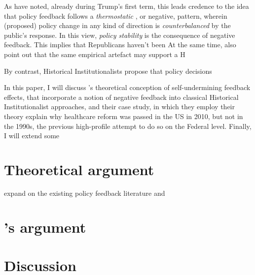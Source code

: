 \documentclass[11pt, xcolor=dvipsnames]{article}
\begin{document}
\noindent As \textcite[][]{Busemeyer2019} have noted, already during Trump's first term, this leads credence to the idea that policy feedback follows a \textit{thermostatic} \parencite[][]{Wlezien1995}, or negative, pattern, wherein (proposed) policy change in any kind of direction is \textit{counterbalanced} by the public's response. In this view, \textit{policy stability} is the consequence of negative feedback. This implies that Republicans haven't been  At the same time, \textcite[][]{Busemeyer2019} also point out that the same empirical artefact may support a H

By contrast, Historical Institutionalists propose that policy decisions 

In this paper, I will discuss \citeauthor[][]{Jacobs2014}'s \citeyear{Jacobs2014} theoretical conception of self-undermining feedback effects, that incorporate a notion of negative feedback into classical Historical Institutionalist approaches, and their case study, in which they employ their theory explain why healthcare reform was passed in the US in 2010, but not in the 1990s, the previous high-profile attempt to do so on the Federal level. Finally, I will extend some



\section*{Theoretical argument}
\textcite[][]{Jacobs2014} expand on the existing policy feedback literature and 
\section*{\citeauthor[][]{Jacobs2014}'s \citeyear{Jacobs2014} argument}


\section*{Discussion}


\newpage
\newpage
\thispagestyle{empty}
\begingroup
{}
\printbibliography
\endgroup
\end{document}
